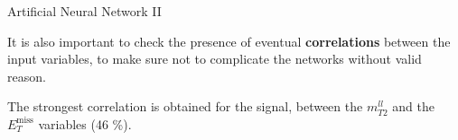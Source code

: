 \documentclass[handout,8 pt]{beamer}
\begin{document}
\begin{frame}{Artificial Neural Network II}

	\justifying 
	It is also important to check the presence of eventual \textbf{correlations} between the input variables, to make sure not to complicate the networks without valid reason. \vfill

\hspace{4pt}
   \begin{minipage}[c]{.02\linewidth}
	\begin{exampleblock}{}  \end{exampleblock}
   \end{minipage}	
   \hspace{5pt}
   \begin{minipage}[c]{.30\linewidth}
   \end{minipage} \hfill
   \begin{minipage}[c]{.30\linewidth}
   \end{minipage} \hfill
   \begin{minipage}[c]{.30\linewidth}
   	\justifying
	The strongest correlation is obtained for the signal, between the $m_{T2}^{ll}$ and the $E_T^{\text{miss}}$ variables (46 \%).
   \end{minipage} \hfill
   

\end{frame}
\end{document}
